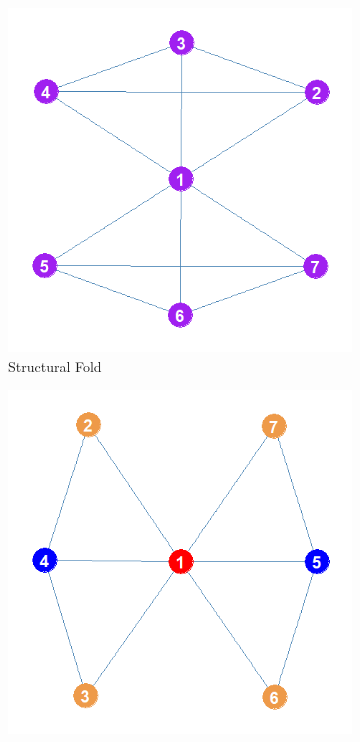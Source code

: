 \documentclass[12pt]{article}
\begin{document}
\begin{figure}
    \captionsetup[subfigure]{font=footnotesize,labelfont=footnotesize}
    \centering
     \begin{subfigure}[b]{0.35\textwidth}
        \includegraphics[width=1.0\textwidth]{Plots/Toys/sf.png}
            \caption{Structural Fold}
            \label{fig:sf}
    \end{subfigure} 
    \begin{subfigure}[b]{0.35\textwidth}
        \includegraphics[width=1.0\textwidth]{Plots/Toys/intra.png}

\end{subfigure}
\end{figure}
\end{document}
